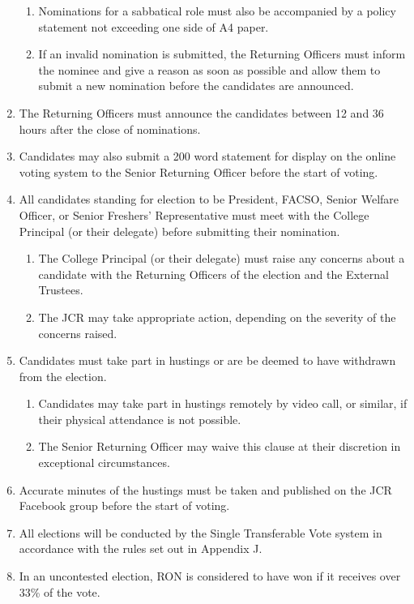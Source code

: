 \documentclass[12pt]{article}
\begin{document}
\begin{enumerate}
\begin{enumerate}
        \item Nominations for a sabbatical role must also be accompanied by a policy statement not exceeding one side of A4 paper.
        \item If an invalid nomination is submitted, the Returning Officers must inform the nominee and give a reason as soon as possible and allow them to submit a new nomination before the candidates are announced.
    \end{enumerate}
    \item The Returning Officers must announce the candidates between 12 and 36 hours after the close of nominations.
    \item Candidates may also submit a 200 word statement for display on the online voting system to the Senior Returning Officer before the start of voting.
    \item All candidates standing for election to be President, FACSO, Senior Welfare Officer, or Senior Freshers' Representative must meet with the College Principal (or their delegate) before submitting their nomination.
    \begin{enumerate}
        \item The College Principal (or their delegate) must raise any concerns about a candidate with the Returning Officers of the election and the External Trustees.
        \item The JCR may take appropriate action, depending on the severity of the concerns raised.
    \end{enumerate}
    \item Candidates must take part in hustings or are be deemed to have withdrawn from the election.
    \begin{enumerate}
        \item Candidates may take part in hustings remotely by video call, or similar, if their physical attendance is not possible.
        \item The Senior Returning Officer may waive this clause at their discretion in exceptional circumstances.
    \end{enumerate}
    \item Accurate minutes of the hustings must be taken and published on the JCR Facebook group before the start of voting.
    \item All elections will be conducted by the Single Transferable Vote system in accordance with the rules set out in Appendix J.
    \item In an uncontested election, RON is considered to have won if it receives over 33\% of the vote.

\end{enumerate}
\end{document}
